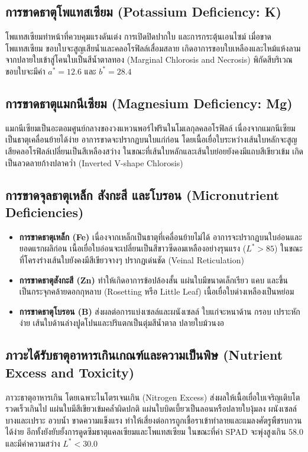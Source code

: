 \subsection{การขาดธาตุโพแทสเซียม (Potassium Deficiency: K)}
โพแทสเซียมทำหน้าที่ควบคุมแรงดันเต่ง การเปิดปิดปากใบ และการกระตุ้นเอนไซม์ เมื่อขาดโพแทสเซียม ขอบใบจะสูญเสียน้ำและคลอโรฟิลล์เสื่อมสลาย เกิดอาการขอบใบเหลืองและไหม้แห้งลามจากปลายใบเข้าสู่โคนใบเป็นสีน้ำตาลทอง (Marginal Chlorosis and Necrosis) พิกัดสีบริเวณขอบใบจะมีค่า $a^*=12.6$ และ $b^*=28.4$

\subsection{การขาดธาตุแมกนีเซียม (Magnesium Deficiency: Mg)}
แมกนีเซียมเป็นอะตอมศูนย์กลางของวงแหวนพอร์ไฟรินในโมเลกุลคลอโรฟิลล์ เนื่องจากแมกนีเซียมเป็นธาตุเคลื่อนย้ายได้ง่าย อาการขาดจะปรากฏบนใบแก่ก่อน โดยเนื้อเยื่อใบระหว่างเส้นใบหลักจะสูญเสียคลอโรฟิลล์เปลี่ยนเป็นสีเหลืองสว่าง ในขณะที่เส้นใบหลักและเส้นใบย่อยยังคงมีแถบสีเขียวเข้ม เกิดเป็นลวดลายก้างปลาคว่ำ (Inverted V-shape Chlorosis)

\subsection{การขาดจุลธาตุเหล็ก สังกะสี และโบรอน (Micronutrient Deficiencies)}
\begin{itemize}
  \item \textbf{การขาดธาตุเหล็ก (Fe)} เนื่องจากเหล็กเป็นธาตุที่เคลื่อนย้ายไม่ได้ อาการจะปรากฏบนใบอ่อนและยอดแรกผลิก่อน เนื้อเยื่อใบอ่อนจะเปลี่ยนเป็นสีขาวซีดอมเหลืองอย่างรุนแรง ($L^*>85$) ในขณะที่โครงร่างเส้นใบยังคงมีสีเขียวจางๆ ปรากฏเด่นชัด (Veinal Reticulation)
  \item \textbf{การขาดธาตุสังกะสี (Zn)} ทำให้เกิดอาการข้อปล้องสั้น แผ่นใบมีขนาดเล็กเรียว แคบ และขึ้นเป็นกระจุกคล้ายดอกกุหลาบ (Rosetting หรือ Little Leaf) เนื้อเยื่อใบด่างเหลืองเป็นหย่อม
  \item \textbf{การขาดธาตุโบรอน (B)} ส่งผลต่อการแบ่งเซลล์และผนังเซลล์ ใบแก่จะหนาด้าน กรอบ เปราะหักง่าย เส้นใบด้านล่างปูดโปนและปริแตกเป็นตุ่มสีน้ำตาล ปลายใบม้วนงอ
\end{itemize}

\subsection{ภาวะได้รับธาตุอาหารเกินเกณฑ์และความเป็นพิษ (Nutrient Excess and Toxicity)}
ภาวะธาตุอาหารเกิน โดยเฉพาะไนโตรเจนเกิน (Nitrogen Excess) ส่งผลให้เนื้อเยื่อใบเจริญเติบโตรวดเร็วเกินไป แผ่นใบมีสีเขียวเข้มคล้ำผิดปกติ แผ่นใบบิดเบี้ยวเป็นลอนหรือปลายใบงุ้มลง ผนังเซลล์บางและเปราะ อวบน้ำ ขาดความแข็งแรง ทำให้เสี่ยงต่อการถูกเชื้อราเข้าทำลายและแมลงศัตรูพืชรบกวนได้ง่าย อีกทั้งยังยับยั้งการดูดซึมธาตุแคลเซียมและโพแทสเซียม ในขณะที่ค่า SPAD จะพุ่งสูงเกิน $58.0$ และมีค่าความสว่าง $L^* < 30.0$

